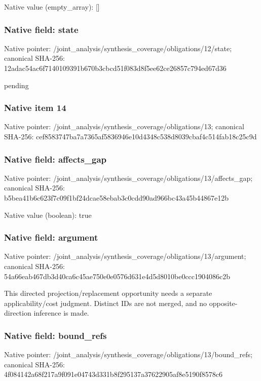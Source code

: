\documentclass[10pt,a4paper]{article}
\begin{document}
Native value (empty\_\allowbreak{}array): []

\subsubsection{Native field: state}
Native pointer: /joint\_\allowbreak{}analysis/synthesis\_\allowbreak{}coverage/obligations/12/state; canonical SHA-256: 12adac54ac6f7140109391b670b3cbcd51f083d8f5ee62ce26857c794ed67d36

\begingroup\raggedright\sloppy pending\par\endgroup

\subsubsection{Native item 14}
Native pointer: /joint\_\allowbreak{}analysis/synthesis\_\allowbreak{}coverage/obligations/13; canonical SHA-256: cef8583747ba7a7365af5836946e10d4348c538d8039cbaf4c514fab18c25c9d

\subsubsection{Native field: affects\_\allowbreak{}gap}
Native pointer: /joint\_\allowbreak{}analysis/synthesis\_\allowbreak{}coverage/obligations/13/affects\_\allowbreak{}gap; canonical SHA-256: b5bea41b6c623f7c09f1bf24dcae58ebab3c0cdd90ad966bc43a45b44867e12b

Native value (boolean): true

\subsubsection{Native field: argument}
Native pointer: /joint\_\allowbreak{}analysis/synthesis\_\allowbreak{}coverage/obligations/13/argument; canonical SHA-256: 54a66eab467db3d40ca6c45ae750e0e0576d631e4d5d8010be0ccc1904086c2b

\begingroup\raggedright\sloppy This directed projection/\allowbreak{}replacement opportunity needs a separate applicability/\allowbreak{}cost judgment. Distinct IDs are not merged,\allowbreak{} and no opposite-direction inference is made.\par\endgroup

\subsubsection{Native field: bound\_\allowbreak{}refs}
Native pointer: /joint\_\allowbreak{}analysis/synthesis\_\allowbreak{}coverage/obligations/13/bound\_\allowbreak{}refs; canonical SHA-256: 4f084142a68f217a9f091e04743d331b8f295137a37622905af8e5190f8578c6
\end{document}
